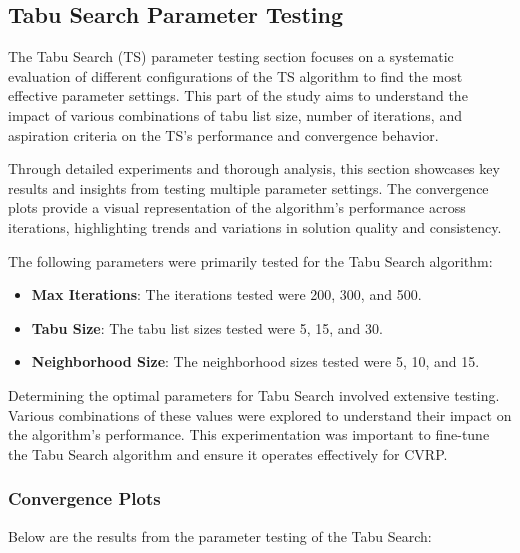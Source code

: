 \documentclass{article}
\begin{document}
    \clearpage

    \newpage


    \subsection{Tabu Search Parameter Testing}

    The Tabu Search (TS) parameter testing section focuses on a systematic evaluation of different configurations of the TS algorithm to find the most effective parameter settings. This part of the study aims to understand the impact of various combinations of tabu list size, number of iterations, and aspiration criteria on the TS's performance and convergence behavior.

    Through detailed experiments and thorough analysis, this section showcases key results and insights from testing multiple parameter settings. The convergence plots provide a visual representation of the algorithm’s performance across iterations, highlighting trends and variations in solution quality and consistency.


    The following parameters were primarily tested for the Tabu Search algorithm:

    \begin{itemize}
        \item \textbf{Max Iterations}: The iterations tested were 200, 300, and 500.
        \item \textbf{Tabu Size}: The tabu list sizes tested were 5, 15, and 30.
        \item \textbf{Neighborhood Size}: The neighborhood sizes tested were 5, 10, and 15.
    \end{itemize}

    Determining the optimal parameters for Tabu Search involved extensive testing. Various combinations of these values were explored to understand their impact on the algorithm's performance. This experimentation was important to fine-tune the Tabu Search algorithm and ensure it operates effectively for CVRP.

    \subsubsection{Convergence Plots}
    Below are the results from the parameter testing of the Tabu Search:
\end{document}
